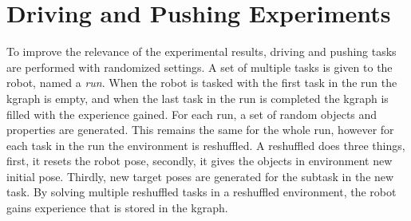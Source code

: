 %
%
%
%

\section{Driving and Pushing Experiments}%
\label{sec:randomization}
To improve the relevance of the experimental results, driving and pushing tasks are performed with randomized settings. A set of multiple tasks is given to the robot, named a \textit{run}. When the robot is tasked with the first task in the run the \ac{kgraph} is empty, and when the last task in the run is completed the \ac{kgraph} is filled with the experience gained. For each run, a set of random objects and properties are generated. This remains the same for the whole run, however for each task in the run the environment is reshuffled. A reshuffled does three things, first, it resets the robot pose, secondly, it gives the objects in environment new initial pose. Thirdly, new target poses are generated for the subtask in the new task. By solving multiple reshuffled tasks in a reshuffled environment, the robot gains experience that is stored in the \ac{kgraph}.\bs

